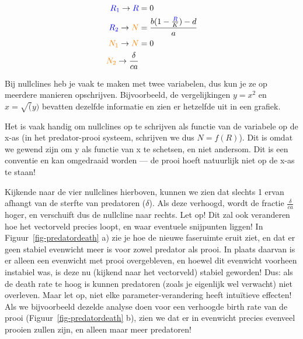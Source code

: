 \documentclass[
  a4paper,
]{scrbook}
\theoremstyle{definition}
\theoremstyle{remark}
\begin{document}
\begin{align*}
    \color{blue}R_{1}\color{black} \rightarrow \color{blue}R &= 0 \\
    \color{blue}R_{2}\color{black} \rightarrow \color{orange}N\color{black} &= \frac{b(1-\frac{\color{blue}R}{K})\color{black} - d}{a} \\
    \color{orange}N_{1}\color{black} \rightarrow \color{orange}N\color{black} &= 0 \\
    \color{orange}N_{2}\color{black} \rightarrow \frac{\delta}{ca}
\end{align*}

\begin{tcolorbox}[enhanced jigsaw, coltitle=black, breakable, bottomtitle=1mm, opacityback=0, colback=white, rightrule=.15mm, title=\textcolor{quarto-callout-warning-color}{\faExclamationTriangle}\hspace{0.5em}{Een nullclines gegeven door X = \ldots, is niet altijd de nullcline voor
X!}, bottomrule=.15mm, toprule=.15mm, left=2mm, colframe=quarto-callout-warning-color-frame, toptitle=1mm, opacitybacktitle=0.6, titlerule=0mm, colbacktitle=quarto-callout-warning-color!10!white, leftrule=.75mm, arc=.35mm]

Bij nullclines heb je vaak te maken met twee variabelen, dus kun je ze
op meerdere manieren opschrijven. Bijvoorbeeld, de vergelijkingen
\(y=x^2\) en \(x=\sqrt(y)\) bevatten dezelfde informatie en zien er
hetzelfde uit in een grafiek.

Het is vaak handig om nullclines op te schrijven als functie van de
variabele op de x-as (in het predator-prooi systeem, schrijven we dus
\(N=f(R)\)). Dit is omdat we gewend zijn om y als functie van x te
schetsen, en niet andersom. Dit is een conventie en kan omgedraaid
worden --- de prooi hoeft natuurlijk niet op de x-as te staan!

\end{tcolorbox}

Kijkende naar de vier nullclines hierboven, kunnen we zien dat slechts 1
ervan afhangt van de sterfte van predatoren (\(\delta\)). Als deze
verhoogd, wordt de fractie \(\frac{\delta}{ca}\) hoger, en verschuift
dus de nullcline naar rechts. Let op! Dit zal ook veranderen hoe het
vectorveld precies loopt, en waar eventuele snijpunten liggen! In
Figuur~\ref{fig-predatordeath} a) zie je hoe de nieuwe faseruimte eruit
ziet, en dat er geen stabiel evenwicht meer is voor zowel predator als
prooi. In plaats daarvan is er alleen een evenwicht met prooi
overgebleven, en hoewel dit evenwicht voorheen instabiel was, is deze nu
(kijkend naar het vectorveld) stabiel geworden! Dus: als de death rate
te hoog is kunnen predatoren (zoals je eigenlijk wel verwacht) niet
overleven. Maar let op, niet elke parameter-verandering heeft intuïtieve
effecten! Als we bijvoorbeeld dezelde analyse doen voor een verhoogde
birth rate van de prooi (Figuur~\ref{fig-predatordeath} b), zien we dat
er in evenwicht precies evenveel prooien zullen zijn, en alleen maar
meer predatoren!
\end{document}
